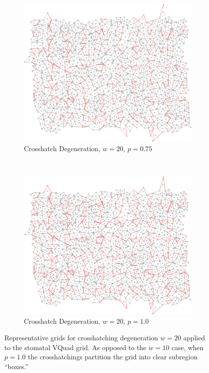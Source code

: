 \documentclass[a4paper,11pt]{article}
\begin{document}
\begin{figure}[htp]
\begin{subfigure}[t]{0.45\textwidth}
  \end{subfigure}

\begin{subfigure}[t]{0.45\textwidth}
  \centering
  \includegraphics[width=\textwidth]{ch6_figs/cross_hatch_p75_w20}
  \caption{Crosshatch Degeneration, $w=20$, $p=0.75$}

  \end{subfigure}
~
\begin{subfigure}[t]{0.45\textwidth}
  \centering
  \includegraphics[width=\textwidth]{ch6_figs/cross_hatch_p100_w20}
  \caption{Crosshatch Degeneration, $w=20$, $p=1.0$}

  \end{subfigure}

\caption[Crosshatch Degeneration, $w=20$]{
  Representative grids for crosshatching degeneration $w=20$ applied to the stomatal VQuad grid. As opposed to the $w=10$ case, when $p=1.0$ the crosshatchings partition the grid into clear subregion ``boxes.''
}
\label{fig:ch_w20_grid}
\end{figure}
\end{document}

